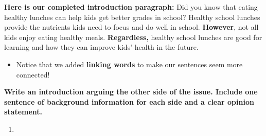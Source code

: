 \documentclass[12pt]{article}
\begin{document}
\begin{tcolorbox}[colframe=black!60, colback=white, 
coltitle=black, colbacktitle=black!15, fonttitle=\bfseries\Large, 
title=Examples, halign title=center, left=10pt, right=10pt, top=10pt, bottom=15pt]
\vspace{1em}

\textbf{Here is  our completed introduction paragraph:} Did you know that eating healthy lunches can help kids get better grades in school? Healthy school lunches provide the nutrients kids need to focus and do well in school.  \textbf{However}, not all kids enjoy eating healthy meals.\textbf{ Regardless,} healthy school lunches are good for learning and how they can improve kids’ health in the future. 
\begin{itemize}
    \item Notice that we added \textbf{linking words} to make our sentences seem more connected!
\end{itemize}







     \end{tcolorbox}

\vspace{1em}
\begin{tcolorbox}[colframe=black!60, colback=white, 
coltitle=black, colbacktitle=black!15, fonttitle=\bfseries\Large, 
title=Guided Practice, halign title=center, left=10pt, right=10pt, top=10pt, bottom=15pt]
\textbf{Write an introduction arguing the other side of the issue. Include one sentence of background information for each side and a clear opinion statement.} 
\vspace{1cm}
\begin{enumerate}[itemsep=4em] %
\item  \underline{\hspace{14.3cm}}  
    \\[0.8cm] \underline{\hspace{14.3cm}}  
    \\[0.8cm] \underline{\hspace{14.3cm}} 
\\[0.8cm] \underline{\hspace{14.3cm}}  
    \\[0.8cm] \underline{\hspace{14.3cm}}  
    \\[0.8cm] \underline{\hspace{14.3cm}} 
    \\[0.8cm] \underline{\hspace{14.3cm}}  
    \\[0.8cm] \underline{\hspace{14.3cm}}  
    \\[0.8cm] \underline{\hspace{14.3cm}}



\end{enumerate}
\vspace{2em}
\end{tcolorbox}
\end{document}
